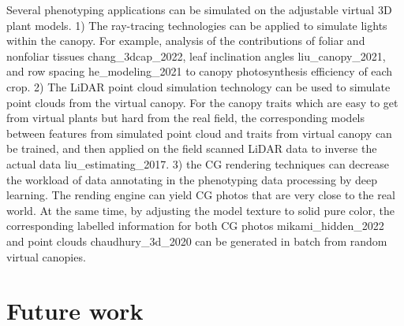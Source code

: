 Several phenotyping applications can be simulated on the adjustable virtual 3D plant models. 1) The ray-tracing technologies can be applied to simulate lights within the canopy. For example, analysis of the contributions of foliar and nonfoliar tissues chang_3dcap_2022, leaf inclination angles liu_canopy_2021, and row spacing he_modeling_2021 to canopy photosynthesis efficiency of each crop. 2) The LiDAR point cloud simulation technology can be used to simulate point clouds from the virtual canopy. For the canopy traits which are easy to get from virtual plants but hard from the real field, the corresponding models between features from simulated point cloud and traits from virtual canopy can be trained, and then applied on the field scanned LiDAR data to inverse the actual data liu_estimating_2017. 3) the CG rendering techniques can decrease the workload of data annotating in the phenotyping data processing by deep learning. The rending engine can yield CG photos that are very close to the real world. At the same time, by adjusting the model texture to solid pure color, the corresponding labelled information for both CG photos mikami_hidden_2022 and point clouds chaudhury_3d_2020 can be generated in batch from random virtual canopies.



\section{Future work}
